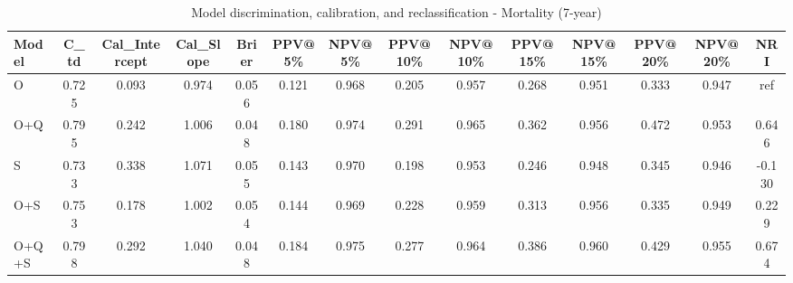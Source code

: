 \begin{table}[htbp]
\centering
\small
\caption{Model discrimination, calibration, and reclassification - Mortality (7-year)}
\label{tab:perf_mortality_7y}
\begin{tabular}{lccccccccccccc}
\toprule
Model & C\_td & Cal\_Intercept & Cal\_Slope & Brier & PPV@5\% & NPV@5\% & PPV@10\% & NPV@10\% & PPV@15\% & NPV@15\% & PPV@20\% & NPV@20\% & NRI \\
\midrule
O & 0.725 & 0.093 & 0.974 & 0.056 & 0.121 & 0.968 & 0.205 & 0.957 & 0.268 & 0.951 & 0.333 & 0.947 & ref \\
O+Q & 0.795 & 0.242 & 1.006 & 0.048 & 0.180 & 0.974 & 0.291 & 0.965 & 0.362 & 0.956 & 0.472 & 0.953 & 0.646 \\
S & 0.733 & 0.338 & 1.071 & 0.055 & 0.143 & 0.970 & 0.198 & 0.953 & 0.246 & 0.948 & 0.345 & 0.946 & -0.130 \\
O+S & 0.753 & 0.178 & 1.002 & 0.054 & 0.144 & 0.969 & 0.228 & 0.959 & 0.313 & 0.956 & 0.335 & 0.949 & 0.229 \\
O+Q+S & 0.798 & 0.292 & 1.040 & 0.048 & 0.184 & 0.975 & 0.277 & 0.964 & 0.386 & 0.960 & 0.429 & 0.955 & 0.674 \\
\bottomrule
\end{tabular}
\end{table}